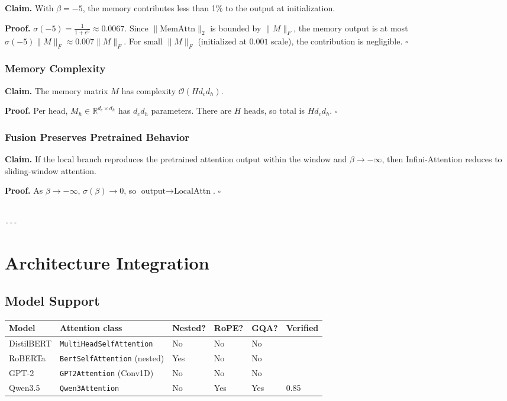\textbf{Claim.} With $\beta = -5$, the memory contributes less than 1\% to the 
output at initialization.

\textbf{Proof.} $\sigma(-5) = \frac{1}{1 + e^5} \approx 0.0067$. Since 
$\|\text{MemAttn}\|_2$ is bounded by $\|M\|_F$, the memory output is at 
most $\sigma(-5) \|M\|_F \approx 0.007 \|M\|_F$. For small $\|M\|_F$ 
(initialized at $0.001$ scale), the contribution is negligible. $\square$

\subsubsection{Memory Complexity}

\textbf{Claim.} The memory matrix $M$ has complexity $\mathcal{O}(H d_c d_h)$.

\textbf{Proof.} Per head, $M_h \in \mathbb{R}^{d_c \times d_h}$ has $d_c d_h$ 
parameters. There are $H$ heads, so total is $H d_c d_h$. $\square$

\subsubsection{Fusion Preserves Pretrained Behavior}

\textbf{Claim.} If the local branch reproduces the pretrained attention output 
within the window and $\beta \to -\infty$, then Infini-Attention reduces to 
sliding-window attention.

\textbf{Proof.} As $\beta \to -\infty$, $\sigma(\beta) \to 0$, so 
$\text{output} \to \text{LocalAttn}$. $\square$
\begin{lstlisting}

---
\end{lstlisting}


\section{Architecture Integration}

\subsection{Model Support}

\begin{table}[H]
\centering
\small
\begin{tabular}{llllll}
\toprule
\textbf{Model} & \textbf{Attention class} & \textbf{Nested?} & \textbf{RoPE?} & \textbf{GQA?} & \textbf{Verified} \\
\midrule
DistilBERT & \texttt{MultiHeadSelfAttention} & No & No & No &  \\
RoBERTa & \texttt{BertSelfAttention} (nested) & Yes & No & No &  \\
GPT-2 & \texttt{GPT2Attention} (Conv1D) & No & No & No &  \\
Qwen3.5 & \texttt{Qwen3Attention} & No & Yes & Yes & 0.85 \\
\bottomrule
\end{tabular}
\end{table}

